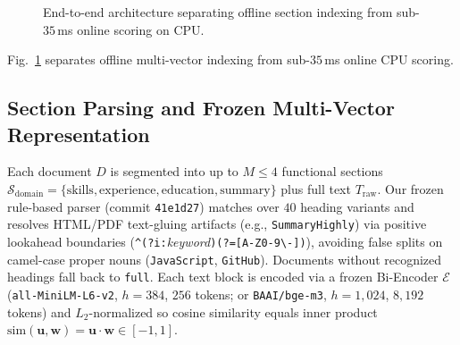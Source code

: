 \begin{figure}[tbp]
{%
}
\caption{End-to-end architecture separating offline section indexing from sub-$35$\,ms online scoring on CPU.}
\label{fig:arch}
\end{figure}

Fig.~\ref{fig:arch} separates offline multi-vector indexing from sub-$35$\,ms online CPU scoring.

\subsection{Section Parsing and Frozen Multi-Vector Representation}
Each document $D$ is segmented into up to $M \le 4$ functional sections $\mathcal{S}_{\text{domain}} = \{\text{skills}, \text{experience}, \text{education}, \text{summary}\}$ plus full text $T_{\text{raw}}$. Our frozen rule-based parser (commit \texttt{41e1d27}) matches over $40$ heading variants and resolves HTML/PDF text-gluing artifacts (e.g., \texttt{SummaryHighly}) via positive lookahead boundaries (\texttt{\textasciicircum(?i:}\textit{keyword}\texttt{)(?=[A-Z0-9\textbackslash-])}), avoiding false splits on camel-case proper nouns (\texttt{JavaScript}, \texttt{GitHub}). Documents without recognized headings fall back to \texttt{full}. Each text block is encoded via a frozen Bi-Encoder $\mathcal{E}$ (\texttt{all-MiniLM-L6-v2}, $h=384$, $256$ tokens; or \texttt{BAAI/bge-m3}, $h=1{,}024$, $8{,}192$ tokens) and $L_2$-normalized so cosine similarity equals inner product $\text{sim}(\mathbf{u}, \mathbf{w}) = \mathbf{u} \cdot \mathbf{w} \in [-1, 1]$.

